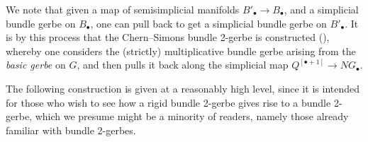 \documentclass[12pt]{amsart}
\theoremstyle{plain}
\theoremstyle{definition}
\theoremstyle{remark}
\numberwithin{equation}{section}
\newcommand{\<}{\langle}
\renewcommand{\>}{\rangle}
\begin{document}
We note that given a map of semisimplicial manifolds $B'_\bullet \to B_\bullet$, and a simplicial bundle gerbe on $B_\bullet$, one can pull back to get a simplicial bundle gerbe on $B'_\bullet$.
It is by this process that the Chern--Simons bundle 2-gerbe is constructed (\cite[Lemma 5.4]{CJMSW}), whereby one considers the (strictly) multiplicative bundle gerbe arising from the \emph{basic gerbe} on $G$, and then pulls it back along the simplicial map $Q^{[\bullet+1]} \to NG_\bullet$.



The following construction is given at a reasonably high level, since it is intended for those who wish to see how a rigid bundle 2-gerbe gives rise to a bundle 2-gerbe, which we presume might be a minority of readers, namely those already familiar with bundle 2-gerbes.
\end{document}
